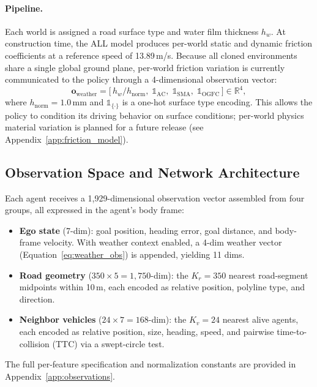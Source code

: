 \paragraph{Pipeline.}
Each world is assigned a road surface type and water film thickness $h_w$.
At construction time, the ALL model produces per-world static and dynamic friction coefficients at a reference speed of 13.89\,m/s.
Because all cloned environments share a single global ground plane, per-world friction variation is currently communicated to the policy through a 4-dimensional observation vector:
\begin{equation}
\label{eq:weather_obs}
\mathbf{o}_{\mathrm{weather}} = \bigl[\, h_w / h_{\mathrm{norm}},\; \mathbb{1}_{\mathrm{AC}},\; \mathbb{1}_{\mathrm{SMA}},\; \mathbb{1}_{\mathrm{OGFC}} \,\bigr] \in \mathbb{R}^4,
\end{equation}
where $h_{\mathrm{norm}} = 1.0$\,mm and $\mathbb{1}_{\{\cdot\}}$ is a one-hot surface type encoding.
This allows the policy to condition its driving behavior on surface conditions; per-world physics material variation is planned for a future release (see Appendix~\ref{app:friction_model}).



\subsection{Observation Space and Network Architecture}
\label{sec:observations}

Each agent receives a 1{,}929-dimensional observation vector assembled from four groups, all expressed in the agent's body frame:
\begin{itemize}[leftmargin=*, itemsep=1pt]
  \item \textbf{Ego state} (7-dim): goal position, heading error, goal distance, and body-frame velocity.  With weather context enabled, a 4-dim weather vector (Equation~\ref{eq:weather_obs}) is appended, yielding 11 dims.
  \item \textbf{Road geometry} ($350 \times 5 = 1{,}750$-dim): the $K_r = 350$ nearest road-segment midpoints within 10\,m, each encoded as relative position, polyline type, and direction.
  \item \textbf{Neighbor vehicles} ($24 \times 7 = 168$-dim): the $K_v = 24$ nearest alive agents, each encoded as relative position, size, heading, speed, and pairwise time-to-collision (TTC) via a swept-circle test.
\end{itemize}
The full per-feature specification and normalization constants are provided in Appendix~\ref{app:observations}.

